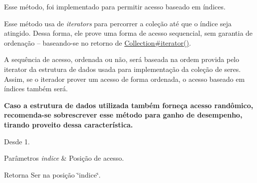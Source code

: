 Esse método, foi implementado para permitir acesso baseado em índices. 

Esse método usa de {\itshape iterators} para percorrer a coleção até que o índice seja atingido. Dessa forma, ele prove uma forma de acesso sequencial, sem garantia de ordenação – baseando-\/se no retorno de \hyperlink{}{Collection\#iterator()}. 

A sequência de acesso, ordenada ou não, será baseada na ordem provida pelo iterator da estrutura de dados usada para implementação da coleção de seres. Assim, se o iterador prover um acesso de forma ordenada, o acesso baseado em índices também será. 

{\bfseries  Caso a estrutura de dados utilizada também forneça acesso randômico, recomenda-\/se sobrescrever esse método para ganho de desempenho, tirando proveito dessa característica. }

\begin{DoxySince}{Desde}
1. 
\end{DoxySince}

\begin{DoxyParams}{Parâmetros}
{\em indice} & Posição de acesso. \\
\hline
\end{DoxyParams}
\begin{DoxyReturn}{Retorna}
Ser na posição \char`\"{}indice\char`\"{}.
\end{DoxyReturn}

